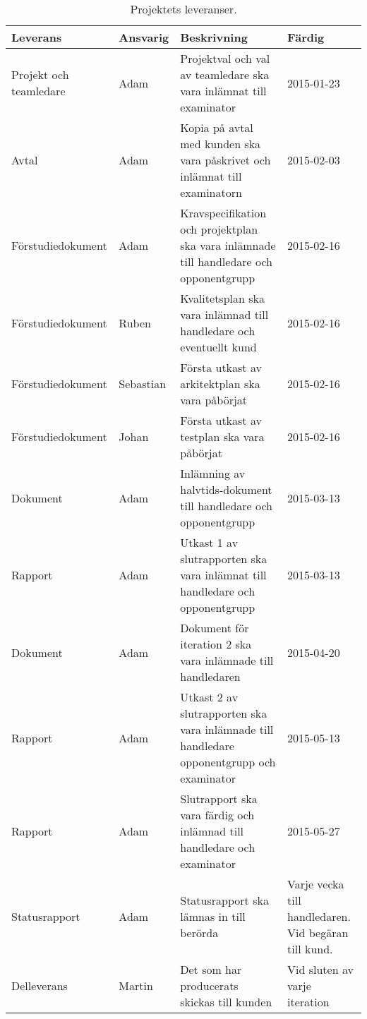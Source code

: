 \begin{table}[H]
  \centering
    \begin{tabularx}{\textwidth}{| X | l | X | X |}
      \hline
      \textbf{Leverans} & \textbf{Ansvarig} & \textbf{Beskrivning} & \textbf{Färdig} \\
      \hline

      {Projekt och teamledare} & {Adam} & {Projektval och val av teamledare ska vara inlämnat till examinator} & {2015-01-23} \\
            \hline
      {Avtal} & {Adam} & {Kopia på avtal med kunden ska vara påskrivet och inlämnat till examinatorn} & {2015-02-03} \\
      \hline
      {Förstudiedokument} & {Adam} & {Kravspecifikation och projektplan ska vara inlämnade till handledare och opponentgrupp} & {2015-02-16} \\
      \hline
      {Förstudiedokument} & {Ruben} & {Kvalitetsplan ska vara inlämnad till handledare och eventuellt kund} & {2015-02-16} \\
      \hline
      {Förstudiedokument} & {Sebastian} & {Första utkast av arkitektplan ska vara påbörjat} & {2015-02-16} \\
      \hline
      {Förstudiedokument} & {Johan} & {Första utkast av testplan ska vara påbörjat} & {2015-02-16} \\
      \hline
      {Dokument} & {Adam} & {Inlämning av halvtids-dokument till handledare och opponentgrupp} & {2015-03-13} \\
      \hline
      {Rapport} & {Adam} & {Utkast 1 av slutrapporten ska vara inlämnat till handledare och opponentgrupp} & {2015-03-13} \\
      \hline
      {Dokument} & {Adam} & {Dokument för iteration 2 ska vara inlämnade till handledaren} & {2015-04-20} \\
      \hline
      {Rapport} & {Adam} & {Utkast 2 av slutrapporten ska vara inlämnade till handledare opponentgrupp och examinator} & {2015-05-13} \\
      \hline
      {Rapport} & {Adam} & {Slutrapport ska vara färdig och inlämnad till handledare och examinator} & {2015-05-27} \\
      \hline
      {Statusrapport} & {Adam} & {Statusrapport ska lämnas in till berörda} & {Varje vecka till handledaren. Vid begäran till kund.} \\
      \hline
      {Delleverans} & {Martin} & {Det som har producerats skickas till kunden} & {Vid sluten av varje iteration} \\
      \hline

    \end{tabularx}
  \caption{Projektets leveranser.} \label{dokumentation:tabell}
\end{table}



